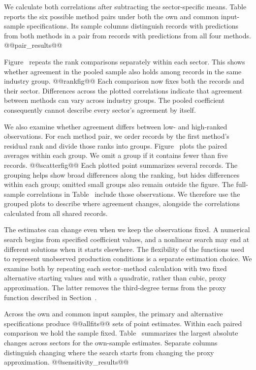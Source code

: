 We calculate both correlations after subtracting the sector-specific means. Table~ reports the six possible method pairs under both the own and common input-sample specifications. Its sample columns distinguish records with predictions from both methods in a pair from records with predictions from all four methods.
@@pair_results@@

Figure~ repeats the rank comparisons separately within each sector. This shows whether agreement in the pooled sample also holds among records in the same industry group.
@@rankfig@@
Each comparison now fixes both the records and their sector. Differences across the plotted correlations indicate that agreement between methods can vary across industry groups. The pooled coefficient consequently cannot describe every sector's agreement by itself.

We also examine whether agreement differs between low- and high-ranked observations. For each method pair, we order records by the first method's residual rank and divide those ranks into groups. Figure~ plots the paired averages within each group. We omit a group if it contains fewer than five records.
@@scatterfig@@
Each plotted point summarizes several records. The grouping helps show broad differences along the ranking, but hides differences within each group; omitted small groups also remain outside the figure. The full-sample correlations in Table~ include those observations. We therefore use the grouped plots to describe where agreement changes, alongside the correlations calculated from all shared records.

The estimates can change even when we keep the observations fixed. A numerical search begins from specified coefficient values, and a nonlinear search may end at different solutions when it starts elsewhere. The flexibility of the functions used to represent unobserved production conditions is a separate estimation choice. We examine both by repeating each sector--method calculation with two fixed alternative starting values and with a quadratic, rather than cubic, proxy approximation. The latter removes the third-degree terms from the proxy function described in Section~.

Across the own and common input samples, the primary and alternative specifications produce @@allfits@@ sets of point estimates. Within each paired comparison we hold the sample fixed. Table~ summarizes the largest absolute changes across sectors for the own-sample estimates. Separate columns distinguish changing where the search starts from changing the proxy approximation.
@@sensitivity_results@@

